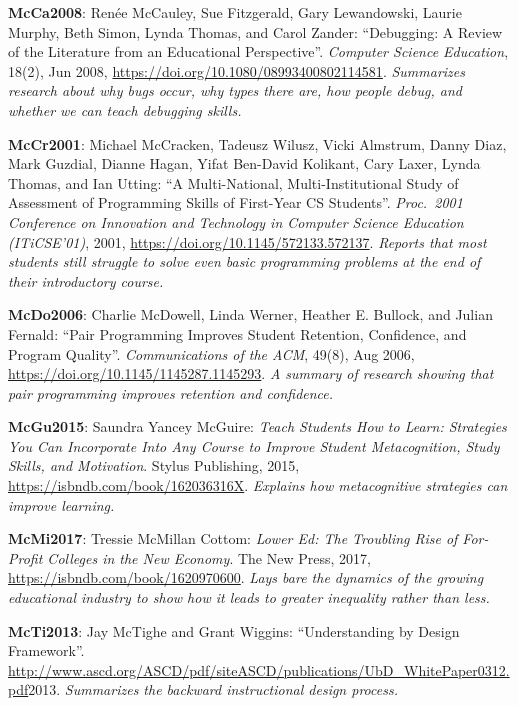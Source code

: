 \textbf{\hypertarget{b:McCa2008}{McCa2008}\label{b:McCa2008}}: Renée McCauley, Sue Fitzgerald, Gary Lewandowski, Laurie Murphy, Beth Simon, Lynda Thomas, and Carol Zander: ``Debugging: A Review of the Literature from an Educational Perspective''. \emph{Computer Science Education}, 18(2), Jun 2008, \url{https://doi.org/10.1080/08993400802114581}. \emph{Summarizes research about why bugs occur, why types there are, how people debug, and whether we can teach debugging skills.}

\textbf{\hypertarget{b:McCr2001}{McCr2001}\label{b:McCr2001}}: Michael McCracken, Tadeusz Wilusz, Vicki Almstrum, Danny Diaz, Mark Guzdial, Dianne Hagan, Yifat Ben-David Kolikant, Cary Laxer, Lynda Thomas, and Ian Utting: ``A Multi-National, Multi-Institutional Study of Assessment of Programming Skills of First-Year CS Students''. \emph{Proc.\ 2001 Conference on Innovation and Technology in Computer Science Education (ITiCSE'01)}, 2001, \url{https://doi.org/10.1145/572133.572137}. \emph{Reports that most students still struggle to solve even basic programming problems at the end of their introductory course.}

\textbf{\hypertarget{b:McDo2006}{McDo2006}\label{b:McDo2006}}: Charlie McDowell, Linda Werner, Heather E. Bullock, and Julian Fernald: ``Pair Programming Improves Student Retention, Confidence, and Program Quality''. \emph{Communications of the ACM}, 49(8), Aug 2006, \url{https://doi.org/10.1145/1145287.1145293}. \emph{A summary of research showing that pair programming improves retention and confidence.}

\textbf{\hypertarget{b:McGu2015}{McGu2015}\label{b:McGu2015}}: Saundra Yancey McGuire: \emph{Teach Students How to Learn: Strategies You Can Incorporate Into Any Course to Improve Student Metacognition, Study Skills, and Motivation}. Stylus Publishing, 2015, \url{https://isbndb.com/book/162036316X}. \emph{Explains how metacognitive strategies can improve learning.}

\textbf{\hypertarget{b:McMi2017}{McMi2017}\label{b:McMi2017}}: Tressie McMillan Cottom: \emph{Lower Ed: The Troubling Rise of For-Profit Colleges in the New Economy}. The New Press, 2017, \url{https://isbndb.com/book/1620970600}. \emph{Lays bare the dynamics of the growing educational industry to show how it leads to greater inequality rather than less.}

\textbf{\hypertarget{b:McTi2013}{McTi2013}\label{b:McTi2013}}: Jay McTighe and Grant Wiggins: ``Understanding by Design Framework''. \url{http://www.ascd.org/ASCD/pdf/siteASCD/publications/UbD_WhitePaper0312.pdf}2013. \emph{Summarizes the backward instructional design process.}

